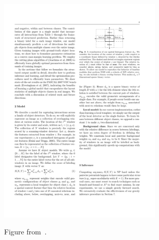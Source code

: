 \begin{figure}[h!]
  \caption{Figure from~\cite{Desai2009}.}
  \centering
    \includegraphics[width=0.7\textwidth]{../figures/dij.pdf}
  \label{fig:dij}
\end{figure}